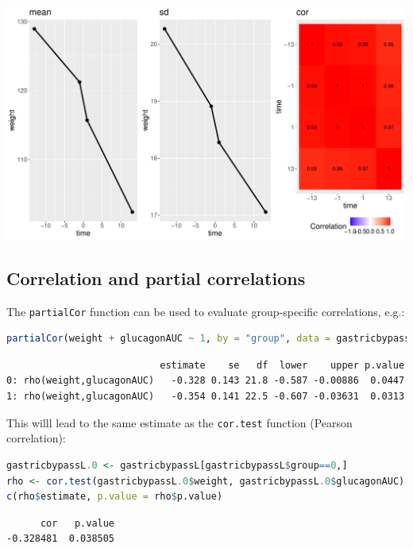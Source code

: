\documentclass[12pt]{article}
\begin{document}
\begin{center}
\includegraphics[trim={0 0 0 0},width=1\textwidth]{./figures/summarize.pdf}
\end{center}

\clearpage
\subsection{Correlation and partial correlations}
\label{sec:org787c306}

The \texttt{partialCor} function can be used to evaluate group-specific
correlations, e.g.:
\begin{lstlisting}[language=r,numbers=none]
partialCor(weight + glucagonAUC ~ 1, by = "group", data = gastricbypassL)
\end{lstlisting}

\label{}
\begin{verbatim}
                           estimate    se   df  lower    upper p.value
0: rho(weight,glucagonAUC)   -0.328 0.143 21.8 -0.587 -0.00886  0.0447
1: rho(weight,glucagonAUC)   -0.354 0.141 22.5 -0.607 -0.03631  0.0313
\end{verbatim}


This willl lead to the same estimate as the \texttt{cor.test} function
(Pearson correlation):
\begin{lstlisting}[language=r,numbers=none]
gastricbypassL.0 <- gastricbypassL[gastricbypassL$group==0,]
rho <- cor.test(gastricbypassL.0$weight, gastricbypassL.0$glucagonAUC)
c(rho$estimate, p.value = rho$p.value)
\end{lstlisting}

\label{}
\begin{verbatim}
      cor   p.value 
-0.328481  0.038505
\end{verbatim}
\end{document}

